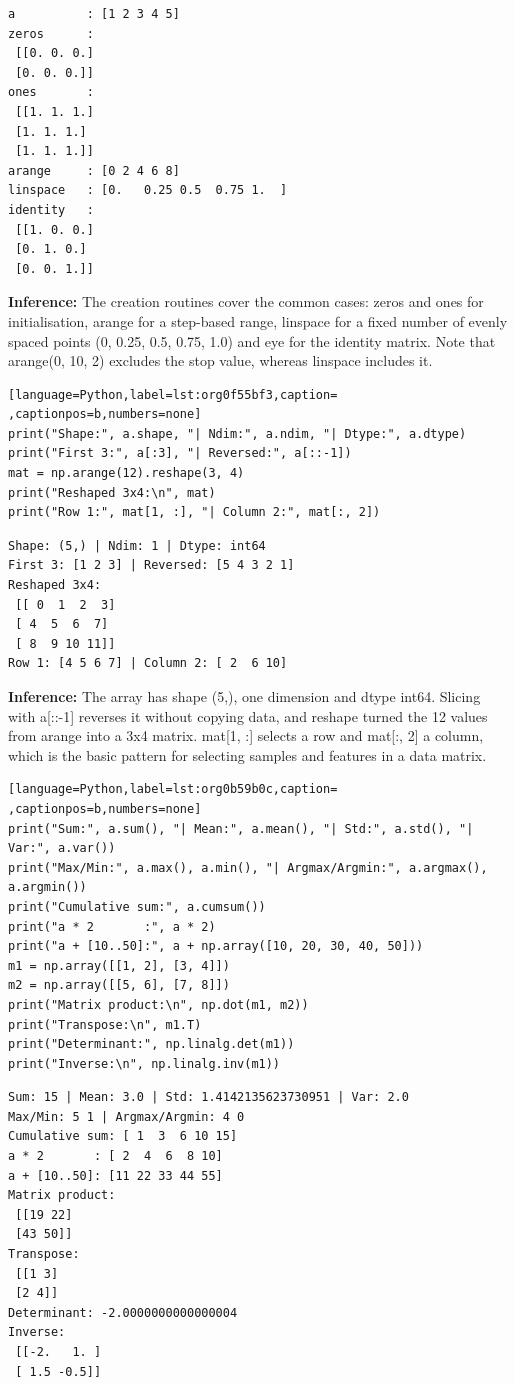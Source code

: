 \documentclass[11pt]{article}
\begin{document}
\begin{verbatim}
a          : [1 2 3 4 5]
zeros      :
 [[0. 0. 0.]
 [0. 0. 0.]]
ones       :
 [[1. 1. 1.]
 [1. 1. 1.]
 [1. 1. 1.]]
arange     : [0 2 4 6 8]
linspace   : [0.   0.25 0.5  0.75 1.  ]
identity   :
 [[1. 0. 0.]
 [0. 1. 0.]
 [0. 0. 1.]]
\end{verbatim}

\textbf{Inference:} The creation routines cover the common cases: zeros and ones for initialisation, arange for
a step-based range, linspace for a fixed number of evenly spaced points (0, 0.25, 0.5, 0.75,
1.0) and eye for the identity matrix. Note that arange(0, 10, 2) excludes the stop value,
whereas linspace includes it.
\begin{lstlisting}[language=Python,label=lst:org0f55bf3,caption= ,captionpos=b,numbers=none]
print("Shape:", a.shape, "| Ndim:", a.ndim, "| Dtype:", a.dtype)
print("First 3:", a[:3], "| Reversed:", a[::-1])
mat = np.arange(12).reshape(3, 4)
print("Reshaped 3x4:\n", mat)
print("Row 1:", mat[1, :], "| Column 2:", mat[:, 2])
\end{lstlisting}

\begin{verbatim}
Shape: (5,) | Ndim: 1 | Dtype: int64
First 3: [1 2 3] | Reversed: [5 4 3 2 1]
Reshaped 3x4:
 [[ 0  1  2  3]
 [ 4  5  6  7]
 [ 8  9 10 11]]
Row 1: [4 5 6 7] | Column 2: [ 2  6 10]
\end{verbatim}


\textbf{Inference:} The array has shape (5,), one dimension and dtype int64. Slicing with a[::-1] reverses it
without copying data, and reshape turned the 12 values from arange into a 3x4 matrix. mat[1,
:] selects a row and mat[:, 2] a column, which is the basic pattern for selecting samples
and features in a data matrix.
\begin{lstlisting}[language=Python,label=lst:org0b59b0c,caption= ,captionpos=b,numbers=none]
print("Sum:", a.sum(), "| Mean:", a.mean(), "| Std:", a.std(), "| Var:", a.var())
print("Max/Min:", a.max(), a.min(), "| Argmax/Argmin:", a.argmax(), a.argmin())
print("Cumulative sum:", a.cumsum())
print("a * 2       :", a * 2)
print("a + [10..50]:", a + np.array([10, 20, 30, 40, 50]))
m1 = np.array([[1, 2], [3, 4]])
m2 = np.array([[5, 6], [7, 8]])
print("Matrix product:\n", np.dot(m1, m2))
print("Transpose:\n", m1.T)
print("Determinant:", np.linalg.det(m1))
print("Inverse:\n", np.linalg.inv(m1))
\end{lstlisting}

\begin{verbatim}
Sum: 15 | Mean: 3.0 | Std: 1.4142135623730951 | Var: 2.0
Max/Min: 5 1 | Argmax/Argmin: 4 0
Cumulative sum: [ 1  3  6 10 15]
a * 2       : [ 2  4  6  8 10]
a + [10..50]: [11 22 33 44 55]
Matrix product:
 [[19 22]
 [43 50]]
Transpose:
 [[1 3]
 [2 4]]
Determinant: -2.0000000000000004
Inverse:
 [[-2.   1. ]
 [ 1.5 -0.5]]
\end{verbatim}
\end{document}

